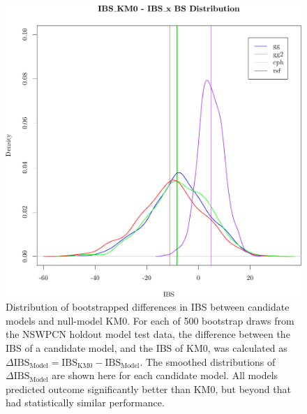 \documentclass[dissertation.tex]{subfiles}
\begin{document}
\begin{figure}
\centering
  \includegraphics[width=.7\linewidth]{analysis/nomogram/figure/05-model-selection-ibs-3}
  \caption[Bootstrapped differences in \acrshort{IBS} between candidate models and KM0]{Distribution of bootstrapped differences in \gls{IBS} between candidate models and null-model KM0.  For each of 500 bootstrap draws from the \gls{NSWPCN} holdout model test data, the difference between the \gls{IBS} of a candidate model, and the \gls{IBS} of KM0, was calculated as $\Delta \mbox{IBS}_{\mbox{Model}} = \mbox{IBS}_{\mbox{KM0}} - \mbox{IBS}_{\mbox{Model}}$.  The smoothed distributions of $\Delta \mbox{IBS}_{\mbox{Model}}$ are shown here for each candidate model.  All models predicted outcome significantly better than KM0, but beyond that had statistically similar performance.}
\label{fig:nomo-ibs-delta}
\end{figure}

\end{document}
